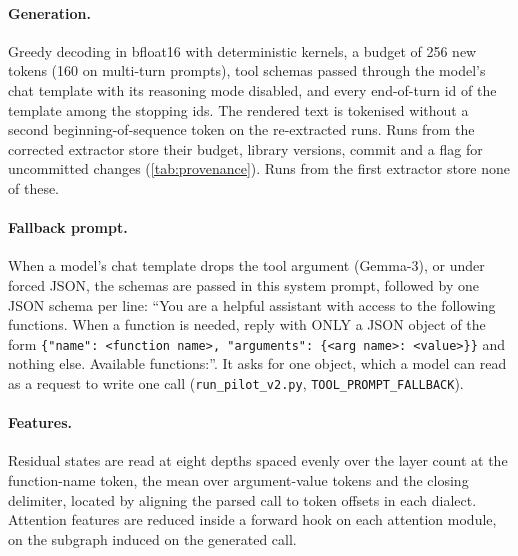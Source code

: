 \paragraph{Generation.} Greedy decoding in bfloat16 with deterministic kernels, a budget of 256 new tokens (160 on multi-turn prompts), tool schemas passed through the model's chat template with its reasoning mode disabled, and every end-of-turn id of the template among the stopping ids. The rendered text is tokenised without a second beginning-of-sequence token on the re-extracted runs. Runs from the corrected extractor store their budget, library versions, commit and a flag for uncommitted changes (\cref{tab:provenance}). Runs from the first extractor store none of these.

\paragraph{Fallback prompt.} When a model's chat template drops the tool argument (Gemma-3), or under forced JSON, the schemas are passed in this system prompt, followed by one JSON schema per line: ``You are a helpful assistant with access to the following functions. When a function is needed, reply with ONLY a JSON object of the form \texttt{\{"name": \textless{}function name\textgreater{}, "arguments": \{\textless{}arg name\textgreater{}: \textless{}value\textgreater{}\}\}} and nothing else. Available functions:''. It asks for one object, which a model can read as a request to write one call (\texttt{run\_pilot\_v2.py}, \texttt{TOOL\_PROMPT\_FALLBACK}).

\paragraph{Features.} Residual states are read at eight depths spaced evenly over the layer count at the function-name token, the mean over argument-value tokens and the closing delimiter, located by aligning the parsed call to token offsets in each dialect. Attention features are reduced inside a forward hook on each attention module, on the subgraph induced on the generated call.

